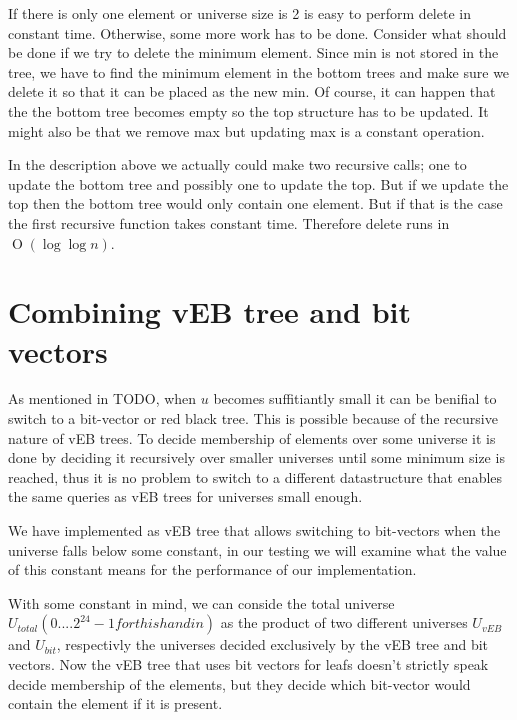 \documentclass[oneside,11pt,openright]{report}
\newcommand{\BigO}[1]{\ensuremath{\operatorname{O}\left(#1\right)}}
\begin{document}
If there is only one element or  universe size is 2 is easy to perform
delete  in  constant  time.  Otherwise,  some  more  work  has  to  be
done. Consider  what should be  done if we  try to delete  the minimum
element. Since  min is  not stored in  the tree, we  have to  find the
minimum element in the bottom trees and make sure we delete it so that
it can be placed as the new min. Of course, it can happen that the the
bottom tree becomes  empty so the top structure has  to be updated. It
might  also be  that we  remove  max but  updating max  is a  constant
operation.

In the description  above we actually could make  two recursive calls;
one to update the bottom tree and  possibly one to update the top. But
if  we update  the top  then the  bottom tree  would only  contain one
element. But  if that is the  case the first recursive  function takes
constant time. Therefore delete runs in $\BigO{\log \log n}$.

\chapter{Combining vEB tree and bit vectors}

As mentioned in TODO, when $u$ becomes suffitiantly small it can be
benifial to switch to a bit-vector or red black tree. This is possible
because of the recursive nature of vEB trees. To decide membership of
elements over some universe it is done by deciding it recursively over
smaller universes until some minimum size is reached, thus it is no
problem to switch to a different datastructure that enables the same
queries as vEB trees for universes small enough.

We have implemented as vEB tree that allows switching to bit-vectors
when the universe falls below some constant, in our testing we will
examine what the value of this constant means for the performance of
our implementation.

With some constant in mind, we can conside the total universe
$U_{total} (0....2^{24}-1 for this handin)$ as the product of two
different universes $U_{vEB}$ and $U_{bit}$, respectivly the universes
decided exclusively by the vEB tree and bit vectors. Now the vEB tree
that uses bit vectors for leafs doesn't strictly speak decide
membership of the elements, but they decide which bit-vector would
contain the element if it is present.
\end{document}
